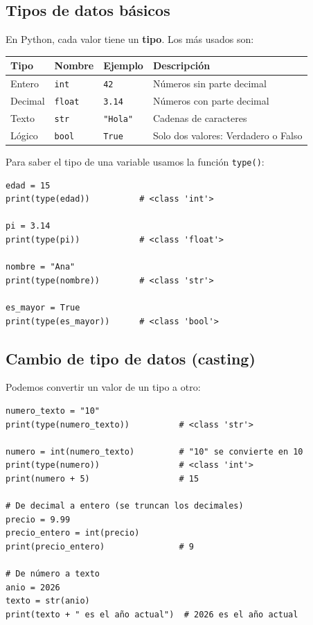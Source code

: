 \documentclass[11pt,a4paper]{article}
\begin{document}
\subsection{Tipos de datos básicos}

En Python, cada valor tiene un \textbf{tipo}. Los más usados son:

\begin{table}[h]
\centering
\begin{tabularx}{\textwidth}{l l l X}
\toprule
\textbf{Tipo} & \textbf{Nombre} & \textbf{Ejemplo} & \textbf{Descripción} \\
\midrule
Entero & \texttt{int} & \texttt{42} & Números sin parte decimal \\
Decimal & \texttt{float} & \texttt{3.14} & Números con parte decimal \\
Texto & \texttt{str} & \texttt{"Hola"} & Cadenas de caracteres \\
Lógico & \texttt{bool} & \texttt{True} & Solo dos valores: Verdadero o Falso \\
\bottomrule
\end{tabularx}
\end{table}

Para saber el tipo de una variable usamos la función \texttt{type()}:

\begin{lstlisting}[style=pythonStyle, caption={La función type()}]
edad = 15
print(type(edad))          # <class 'int'>

pi = 3.14
print(type(pi))            # <class 'float'>

nombre = "Ana"
print(type(nombre))        # <class 'str'>

es_mayor = True
print(type(es_mayor))      # <class 'bool'>
\end{lstlisting}

\subsection{Cambio de tipo de datos (casting)}

Podemos convertir un valor de un tipo a otro:

\begin{lstlisting}[style=pythonStyle, caption={Conversión de tipos}]
numero_texto = "10"
print(type(numero_texto))          # <class 'str'>

numero = int(numero_texto)         # "10" se convierte en 10
print(type(numero))                # <class 'int'>
print(numero + 5)                  # 15

# De decimal a entero (se truncan los decimales)
precio = 9.99
precio_entero = int(precio)
print(precio_entero)               # 9

# De número a texto
anio = 2026
texto = str(anio)
print(texto + " es el año actual")  # 2026 es el año actual
\end{lstlisting}
\end{document}
